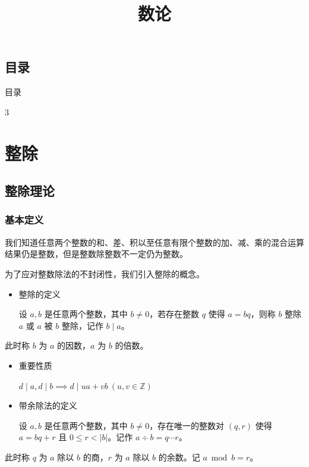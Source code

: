 \documentclass [hyperref={bookmarksdepth=4}, aspectratio=169] {beamer}
\theoremstyle {fy}
\def\Z{\mathbb{Z}}
\begin{document}
\title {数论}
\author {}
\date {}

\frame \titlepage

\subsection*{目录}

\begin{frame}{目录}
	\begin{multicols}{3}
		\tableofcontents[subsubsectionstyle=hide]
	\end{multicols}
\end{frame}

\section{整除}

\subsection{整除理论}

\subsubsection{基本定义}

\begin{frame}{}
我们知道任意两个整数的和、差、积以至任意有限个整数的加、减、乘的混合运算结果仍是整数，但是整数除整数不一定仍为整数。

为了应对整数除法的不封闭性，我们引入整除的概念。

\begin{itemize}
    \item 整除的定义

  设 $a,b$ 是任意两个整数，其中 $b\neq 0$，若存在整数 $q$ 使得 $a=bq$，则称 $b$ 整除 $a$ 或 $a$ 被 $b$ 整除，记作 $b\mid a$。
\end{itemize}

此时称 $b$ 为 $a$ 的因数，$a$ 为 $b$ 的倍数。

\begin{itemize}
    \item 重要性质

  $d\mid a,d\mid b\implies d\mid ua+vb\ (u,v\in\Z)$

    \item 带余除法的定义

  设 $a,b$ 是任意两个整数，其中 $b\neq 0$，存在唯一的整数对 $(q,r)$ 使得 $a=bq+r$ 且 $0\le r<|b|$。记作 $a\div b=q\cdots r$。
\end{itemize}

此时称 $q$ 为 $a$ 除以 $b$ 的商，$r$ 为 $a$ 除以 $b$ 的余数。记 $a\bmod b=r$。
\end{frame}
\end{document}
